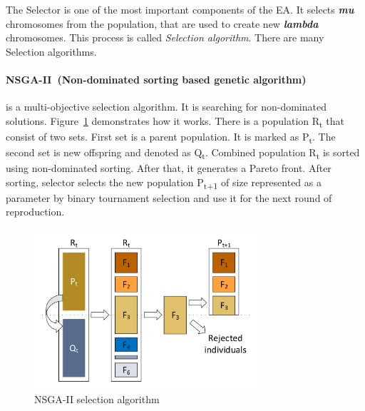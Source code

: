 The Selector is one of the most important components of the EA. It selects \textit{\textbf{mu}} chromosomes from the population, that are used to create new \textit{\textbf{lambda}} chromosomes. This process is called \textit{Selection algorithm}. There are many Selection algorithms.


\paragraph{NSGA-II~(Non-dominated sorting based genetic algorithm)~\cite{deb2000}} is a multi-objective selection algorithm. It is searching for non-dominated solutions. Figure~\ref{fig:nsga2} demonstrates how it works. There is a population \texorpdfstring{R\textsubscript{t}}{R t} that consist of two sets. First set is a parent population. It is marked as \texorpdfstring{P\textsubscript{t}}{P t}. The second set is new offspring and denoted as \texorpdfstring{Q\textsubscript{t}}{Q t}. Combined population \texorpdfstring{R\textsubscript{t}}{R t} is sorted using non-dominated sorting. After that, it generates a Pareto front. After sorting, selector selects the new population \texorpdfstring{P\textsubscript{t+1}}{P t+1} of size represented as a parameter by binary tournament selection and use it for the next round of reproduction.

\begin{figure}
	\centering
	\includegraphics[width=0.75\textwidth]{images/nsga2.pdf}
	\caption[NSGA-II selection algorithm]{NSGA-II selection algorithm}
	\label{fig:nsga2}
\end{figure}

